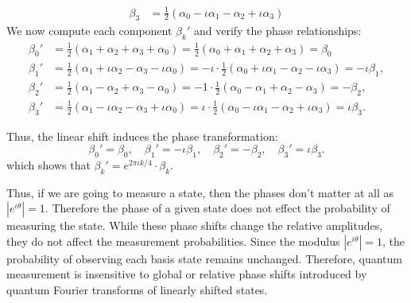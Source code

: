 \begin{example}
\begin{align*}
    \beta_3 &=\frac{1}{2}(\alpha_0 -\iota \alpha_1 -\alpha_2+\iota\alpha_3)
\end{align*}
We now compute each component \( \beta_k' \) and verify the phase relationships:
\begin{align*}
\beta_0' &= \frac{1}{2}(\alpha_1+\alpha_2+\alpha_3+\alpha_0) = \frac{1}{2}(\alpha_0+\alpha_1+\alpha_2+\alpha_3)=\beta_0\\
    \beta_1' &= \frac{1}{2} (\alpha_1 + \iota\alpha_2 - \alpha_3 - \iota\alpha_0) = -\iota \cdot \frac{1}{2} (\alpha_0 + \iota\alpha_1 - \alpha_2 - \iota\alpha_3) = -\iota \beta_1, \\
    \beta_2' &= \frac{1}{2} (\alpha_1 - \alpha_2 + \alpha_3 - \alpha_0)
    = -1 \cdot \frac{1}{2} (\alpha_0 - \alpha_1 + \alpha_2 - \alpha_3) = -\beta_2, \\
    \beta_3' &= \frac{1}{2} (\alpha_1 - \iota\alpha_2 - \alpha_3 + \iota\alpha_0)
    = \iota \cdot \frac{1}{2} (\alpha_0 - \iota\alpha_1 - \alpha_2 + \iota\alpha_3) = \iota \beta_3.
\end{align*}

Thus, the linear shift induces the phase transformation:
\[
\beta_0'=\beta_0,\quad  \beta_1' = -\iota \beta_1, \quad \beta_2' = - \beta_2, \quad \beta_3' = \iota \beta_3.
\]
which shows that $\beta_k' = e^{2\pi\iota k/4}\cdot \beta_k$.
\end{example}
\begin{remark}
Thus, if we are going to measure a state, then the phases don't matter at all as $|e^{\iota \theta}|=1$. Therefore the phase of a given state does not effect the probability of measuring the state. While these phase shifts change the relative amplitudes, they do not affect the measurement probabilities. Since the modulus \( |e^{i\theta}| = 1 \), the probability of observing each basis state remains unchanged. Therefore, quantum measurement is insensitive to global or relative phase shifts introduced by quantum Fourier transforms of linearly shifted states.
\end{remark} 

